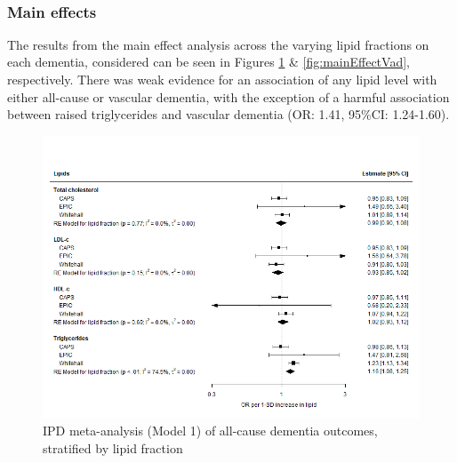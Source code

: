 \documentclass[a4paper, twoside]{templates/ociamthesis}
\begin{document}
~

\hypertarget{main-effects}{%
\subsubsection{Main effects}\label{main-effects}}

The results from the main effect analysis across the varying lipid fractions on each dementia, considered can be seen in Figures \ref{fig:mainEffectDem} \& \ref{fig:mainEffectVad}, respectively. There was weak evidence for an association of any lipid level with either all-cause or vascular dementia, with the exception of a harmful association between raised triglycerides and vascular dementia (OR: 1.41, 95\%CI: 1.24-1.60).





\begin{figure}[H]
\includegraphics[width=1\linewidth]{figures/ipd/main_Dementia} \caption[IPD meta-analysis of all-cause dementia, stratified by lipid fraction]{IPD meta-analysis (Model 1) of all-cause dementia outcomes, stratified by lipid fraction}\label{fig:mainEffectDem}
\end{figure}
\end{document}
